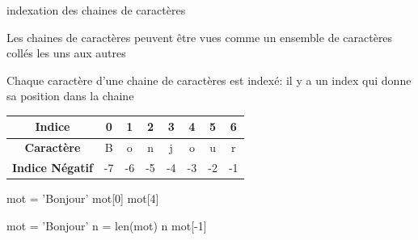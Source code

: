 \begin{easybox}{indexation des chaines de caractères}{}
    
    \begin{minipage}{0.5\linewidth}
 Les chaines de caractères peuvent être vues comme un ensemble de caractères \og{}collés\fg{} les uns aux autres

    Chaque caractère d'une chaine de caractères est indexé: 
    il y a un index qui donne sa position dans la chaine       
    \end{minipage}\hfill{}
    \begin{minipage}{0.5\linewidth}
 \begin{center}
        \begin{tabular}{|c|c|c|c|c|c|c|c|}
        \hline
        \textbf{Indice} & 0 & 1 & 2 & 3 & 4 & 5 & 6 \\
        \hline
        \textbf{Caractère} & B & o & n & j & o & u & r \\
        \hline
        \textbf{Indice Négatif} & -7 & -6 & -5 & -4 & -3 & -2 & -1 \\
        \hline
        \end{tabular}
    \end{center}       
    \end{minipage}
    
   
    

    \begin{minipage}[t]{0.48\linewidth}
        \begin{ConsolePythontex}[TaillePolice=\normalsize, Label=false]{}
            mot = 'Bonjour'
            mot[0]
            mot[4]
        \end{ConsolePythontex}
    \end{minipage}\hfill
    \begin{minipage}[t]{0.48\linewidth}
        \begin{ConsolePythontex}[TaillePolice=\normalsize, Label=false]{}
mot = 'Bonjour'
n = len(mot)
n
mot[-1]
		\end{ConsolePythontex}
    \end{minipage}
   
\end{easybox}

